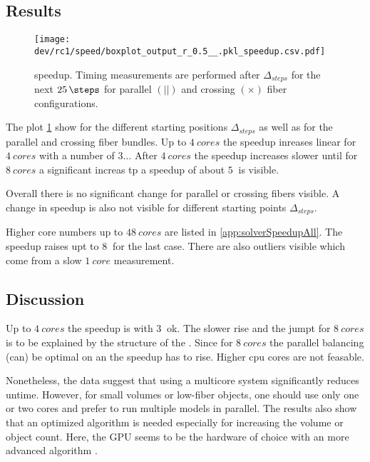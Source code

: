 \subsection{Results}
% 
\begin{figure}[!t]
\centering
\texttt{[image: dev/rc1/speed/boxplot\_output\_r\_0.5\_\_.pkl\_speedup.csv.pdf]}
\caption{ speedup. Timing measurements are performed after $\Delta_{\mathit{steps}}$ for the next $\SI{25}{\steps}$ for parallel $(||)$ and crossing $(\times)$ fiber configurations.}
\label{fig:solverSpeedup}
\end{figure}
% 
The plot \cref{fig:solverSpeedup} show for the different starting positions $\Delta_{\mathit{steps}}$ as well as for the parallel and crossing fiber bundles.
Up to $\SI{4}{cores}$ the speedup inreases linear for $\SI{4}{cores}$ with a number of 3...
After $\SI{4}{cores}$ the speedup increases slower until for $\SI{8}{cores}$ a significant increas tp a speedup of about $\SI{5}{}$ is visible.
\par
% 
Overall there is no significant change for parallel or crossing fibers visible.
A change in speedup is also not visible for different starting points $\Delta_{\mathit{steps}}$.
\par
% 
Higher core numbers up to $\SI{48}{cores}$ are listed in \cref{app:solverSpeedupAll}.
The speedup raises upt to $\SI{8}{}$ for the last case.
There are also outliers visible which come from a slow $\SI{1}{core}$ measurement.
% 
% 
% 
\subsection{Discussion}
% 
Up to $\SI{4}{cores}$ the speedup is with $\SI{3}{}$ ok.
The slower rise and the jumpt for $\SI{8}{cores}$ is to be explained by the structure of the .
Since for $\SI{8}{cores}$ the parallel balancing (can) be optimal on an  the speedup has to rise.
Higher cpu cores are not feasable.
\par
% 
Nonetheless, the data suggest that using a multicore system significantly reduces untime.
However, for small volumes or low-fiber objects, one should use only one or two cores and prefer to run multiple models in parallel.
The results also show that an optimized algorithm is needed especially for increasing the volume or object count.
Here, the \ac{GPU} seems to be the hardware of choice with an more advanced algorithm \cite{Karras2012}.
% 
%
%
